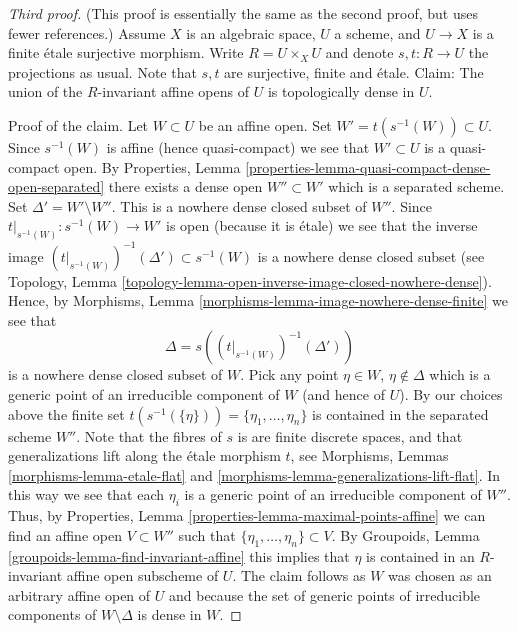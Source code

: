 \begin{proof}[Third proof]
(This proof is essentially the same as the second proof, but uses
fewer references.)
Assume $X$ is an algebraic space, $U$ a scheme, and $U \to X$ is a finite
\'etale surjective morphism. Write $R = U \times_X U$ and denote
$s, t : R \to U$ the projections as usual. Note that $s, t$ are surjective,
finite and \'etale. Claim: The union of the $R$-invariant affine opens of
$U$ is topologically dense in $U$.

\medskip\noindent
Proof of the claim. Let $W \subset U$ be an affine open.
Set $W' = t(s^{-1}(W)) \subset U$. Since $s^{-1}(W)$ is affine
(hence quasi-compact) we see that $W' \subset U$ is a quasi-compact open. By
Properties, Lemma \ref{properties-lemma-quasi-compact-dense-open-separated}
there exists a dense open $W'' \subset W'$ which is a separated scheme.
Set $\Delta' = W' \setminus W''$. This is a nowhere dense closed subset of
$W''$. Since $t|_{s^{-1}(W)} : s^{-1}(W) \to W'$ is open (because it is \'etale)
we see that the inverse image
$(t|_{s^{-1}(W)})^{-1}(\Delta') \subset s^{-1}(W)$
is a nowhere dense closed subset (see
Topology, Lemma \ref{topology-lemma-open-inverse-image-closed-nowhere-dense}).
Hence, by
Morphisms, Lemma \ref{morphisms-lemma-image-nowhere-dense-finite}
we see that
$$
\Delta = s\left((t|_{s^{-1}(W)})^{-1}(\Delta')\right)
$$
is a nowhere dense closed subset of $W$. Pick any point $\eta \in W$,
$\eta \not \in \Delta$ which is a generic point of an irreducible
component of $W$ (and hence of $U$). By our choices above the finite set
$t(s^{-1}(\{\eta\})) = \{\eta_1, \ldots, \eta_n\}$
is contained in the separated scheme $W''$.
Note that the fibres of $s$ is are finite discrete spaces, and that
generalizations lift along the \'etale morphism $t$, see
Morphisms, Lemmas \ref{morphisms-lemma-etale-flat}
and \ref{morphisms-lemma-generalizations-lift-flat}.
In this way we see that each $\eta_i$ is a generic point of an
irreducible component of $W''$. Thus, by
Properties, Lemma \ref{properties-lemma-maximal-points-affine}
we can find an affine open $V \subset W''$ such that
$\{\eta_1, \ldots, \eta_n\} \subset V$.
By
Groupoids, Lemma \ref{groupoids-lemma-find-invariant-affine}
this implies that $\eta$ is contained in an $R$-invariant affine
open subscheme of $U$. The claim follows as $W$ was chosen as an
arbitrary affine open of $U$ and because the set of generic points
of irreducible components of $W \setminus \Delta$ is dense in $W$.


\end{proof}
